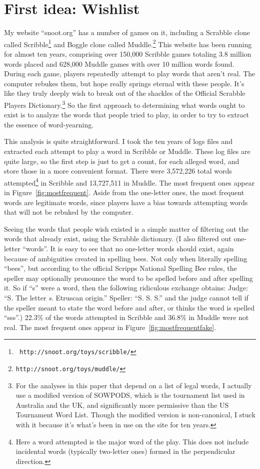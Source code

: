 \documentclass[twocolumn]{article}
\begin{document}
\section{First idea: Wishlist}

My website ``{\sf snoot.org}'' has a number of games on it, including
a Scrabble clone called Scribble\footnote{{\tt
    http://snoot.org/toys/scribble/}} and Boggle clone called
Muddle.\!\footnote{{\tt http://snoot.org/toys/muddle/}} This website
has been running for almost ten years, comprising over 150,000
Scribble games totaling 3.8 million words placed and 628,000 Muddle
games with over 10 million words found. During each game, players
repeatedly attempt to play words that aren't real. The computer
rebukes them, but hope really springs eternal with these people. It's
like they truly deeply wish to break out of the shackles of the
Official Scrabble Players Dictionary.\!\footnote{For the analyses in
  this paper that depend on a list of legal words, I actually use a
  modified version of SOWPODS, which is the tournament list used in
  Australia and the UK, and significantly more permissive than the US
  Tournament Word List. Though the modified version is non-canonical,
  I stuck with it because it's what's been in use on the site for
  ten years.} So the first approach to determining what
words ought to exist is to analyze the words that people tried to
play, in order to try to extract the essence of word-yearning.

This analysis is quite straightforward. I took the ten years of logs
files and extracted each attempt to play a word in Scribble or Muddle.
These log files are quite large, so the first step is just to get a
count, for each alleged word, and store those in a more convenient
format. There were 3,572,226 total words attempted\footnote{Here a
  word attempted is the major word of the play. This does not include
  incidental words (typically two-letter ones) formed in the
  perpendicular direction.} in Scribble and 13,727,511 in Muddle. The
most frequent ones appear in Figure~\ref{fig:mostfrequent}. Aside from
the one-letter ones, the most frequent words are legitimate words,
since players have a bias towards attempting words that will not be
rebuked by the computer.

Seeing the words that people wish existed is a simple matter of
filtering out the words that already exist, using the Scrabble
dictionary. (I also filtered out one-letter ``words''. It is easy to
see that no one-letter words should exist, again because of
ambiguities created in spelling bees. Not only when literally spelling
``bees'', but according to the official Scripps National Spelling Bee
rules, the speller may optionally pronounce the word to be spelled
before and after spelling it. So if ``s'' were a word, then the
following ridiculous exchange obtains: Judge: ``S. The letter {\it s}.
Etruscan origin.'' Speller: ``S. S. S.'' and the judge cannot tell if
the speller meant to state the word before and after, or thinks the
word is spelled ``sss''.) 22.3\% of the words attempted in Scribble
and 36.8\% in Muddle were not real. The most frequent ones appear in
Figure~\ref{fig:mostfrequentfake}.
\end{document}

